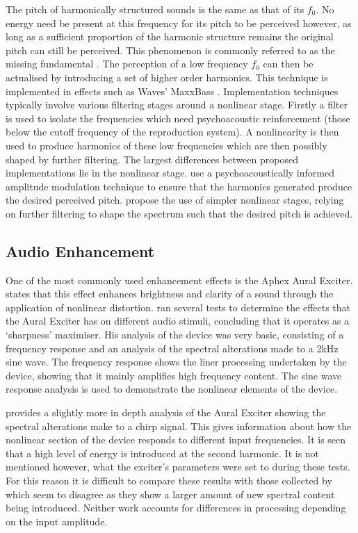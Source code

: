 		The pitch of harmonically structured sounds is the same as that of its $f_{0}$. No energy need be present at
		this frequency for its pitch to be perceived however, as long as a sufficient proportion of the harmonic
		structure remains the original pitch can still be perceived. This phenomenon is commonly referred to as the
		missing fundamental \citep{plack2005the}. The perception of a low frequency $f_{0}$ can then be
		actualised by introducing a set of higher order harmonics. This technique is implemented in effects such as
		Waves' MaxxBass \citep{ben-tzur1999the}. Implementation techniques typically involve various filtering
		stages around a nonlinear stage. Firstly a filter is used to isolate the frequencies which need
		psychoacoustic reinforcement (those below the cutoff frequency of the reproduction system). A nonlinearity
		is then used to produce harmonics of these low frequencies which are then possibly shaped by further
		filtering. The largest differences between proposed implementations lie in the nonlinear stage.
		\citet{gan2001virtual} use a psychoacoustically informed amplitude modulation technique to ensure that the
		harmonics generated produce the desired perceived pitch. \citet{larsen2002reproducing} propose the use of
		simpler nonlinear stages, relying on further filtering to shape the spectrum such that the desired pitch is
		achieved.

	\subsection{Audio Enhancement}
	\label{sec:Excitation-Uses-Enhancement}
		One of the most commonly used enhancement effects is the Aphex Aural Exciter. \citet{shekar2013modeling}
		states that this effect enhances brightness and clarity of a sound through the application of nonlinear
		distortion. \citet{chalupper2000aural} ran several tests to determine the effects that the Aural Exciter has
		on different audio stimuli, concluding that it operates as a `sharpness' maximiser. His analysis of the
		device was very basic, consisting of a frequency response and an analysis of the spectral alterations made
		to a 2kHz sine wave. The frequency response shows the liner processing undertaken by the device, showing
		that it mainly amplifies high frequency content. The sine wave response analysis is used to demonstrate the
		nonlinear elements of the device. 

		\citet{dutilleux2011nonlinear} provides a slightly more in depth analysis of the Aural Exciter showing the
		spectral alterations make to a chirp signal. This gives information about how the nonlinear section of the
		device responds to different input frequencies. It is seen that a high level of energy is introduced at the
		second harmonic. It is not mentioned however, what the exciter's parameters were set to during these tests.
		For this reason it is difficult to compare these results with those collected by \citet{chalupper2000aural}
		which seem to disagree as they show a larger amount of new spectral content being introduced. Neither work
		accounts for differences in processing depending on the input amplitude.


